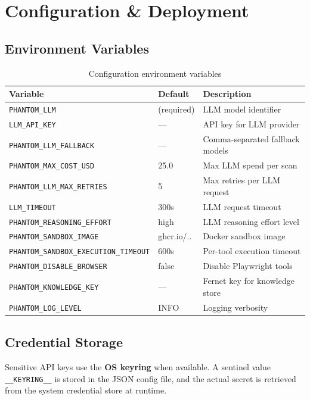 \documentclass[12pt,a4paper]{report}
\begin{document}
\chapter{Configuration \& Deployment}
\label{ch:config}

\section{Environment Variables}
\begin{longtable}{lp{2.5cm}p{6cm}}
\caption{Configuration environment variables} \label{tab:config} \\
\toprule
\textbf{Variable} & \textbf{Default} & \textbf{Description} \\
\midrule
\endfirsthead
\endhead
\bottomrule
\endfoot
\texttt{PHANTOM\_LLM}                    & (required)  & LLM model identifier \\
\texttt{LLM\_API\_KEY}                   & ---         & API key for LLM provider \\
\texttt{PHANTOM\_LLM\_FALLBACK}          & ---         & Comma-separated fallback models \\
\texttt{PHANTOM\_MAX\_COST\_USD}          & 25.0        & Max LLM spend per scan \\
\texttt{PHANTOM\_LLM\_MAX\_RETRIES}       & 5           & Max retries per LLM request \\
\texttt{LLM\_TIMEOUT}                     & 300s        & LLM request timeout \\
\texttt{PHANTOM\_REASONING\_EFFORT}       & high        & LLM reasoning effort level \\
\texttt{PHANTOM\_SANDBOX\_IMAGE}          & ghcr.io/..  & Docker sandbox image \\
\texttt{PHANTOM\_SANDBOX\_EXECUTION\_TIMEOUT} & 600s   & Per-tool execution timeout \\
\texttt{PHANTOM\_DISABLE\_BROWSER}        & false       & Disable Playwright tools \\
\texttt{PHANTOM\_KNOWLEDGE\_KEY}          & ---         & Fernet key for knowledge store \\
\texttt{PHANTOM\_LOG\_LEVEL}              & INFO        & Logging verbosity \\
\end{longtable}

\section{Credential Storage}
Sensitive API keys use the \textbf{OS keyring} when available. A sentinel value
\texttt{\_\_KEYRING\_\_} is stored in the JSON config file, and the actual secret
is retrieved from the system credential store at runtime.
\end{document}
